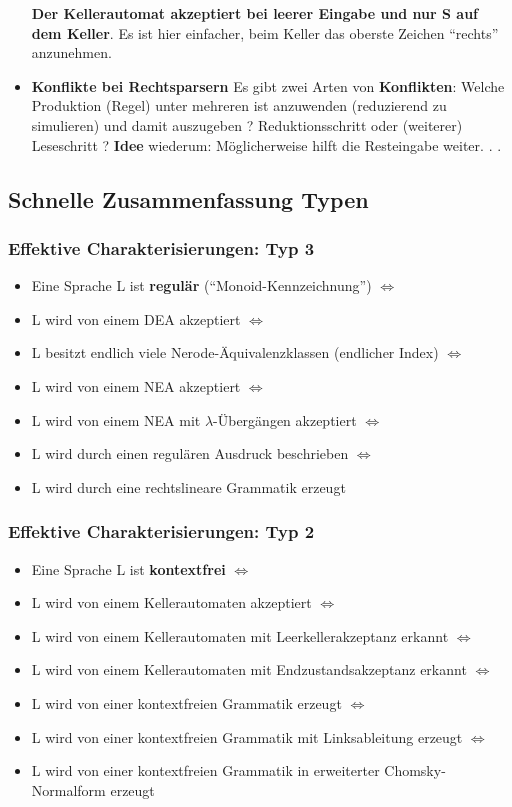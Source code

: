 \documentclass[12pt, a4paper]{article}
\begin{document}
\begin{itemize}
			\subitem\textbf{Der Kellerautomat akzeptiert bei leerer Eingabe und nur S auf dem Keller}.
			\subitem Es ist hier einfacher, beim Keller das oberste Zeichen “rechts” anzunehmen.
			
		\item \textbf{Konflikte bei Rechtsparsern}
			\subitem Es gibt zwei Arten von \textbf{Konflikten}:
			\subitem Welche Produktion (Regel) unter mehreren ist anzuwenden (reduzierend zu simulieren) und damit auszugeben ? Reduktionsschritt oder (weiterer) Leseschritt ?
			\subitem \textbf{Idee} wiederum: Möglicherweise hilft die Resteingabe weiter. . .
	\end{itemize}

	\subsection{Schnelle Zusammenfassung Typen}
		\subsubsection{Effektive Charakterisierungen: Typ 3}
		\begin{itemize}
			\item Eine Sprache L ist \textbf{regulär} (“Monoid-Kennzeichnung”) $\Leftrightarrow$
			\item L wird von einem DEA akzeptiert $\Leftrightarrow$
			\item L besitzt endlich viele Nerode-Äquivalenzklassen (endlicher Index) $\Leftrightarrow$
			\item L wird von einem NEA akzeptiert $\Leftrightarrow$
			\item L wird von einem NEA mit $\lambda$-Übergängen akzeptiert $\Leftrightarrow$
			\item L wird durch einen regulären Ausdruck beschrieben $\Leftrightarrow$
			\item L wird durch eine rechtslineare Grammatik erzeugt
		\end{itemize}
	
		\subsubsection{Effektive Charakterisierungen: Typ 2}
		\begin{itemize}
			\item Eine Sprache L ist \textbf{kontextfrei} $\Leftrightarrow$
			\item L wird von einem Kellerautomaten akzeptiert $\Leftrightarrow$
			\item L wird von einem Kellerautomaten mit Leerkellerakzeptanz erkannt $\Leftrightarrow$
			\item L wird von einem Kellerautomaten mit Endzustandsakzeptanz erkannt $\Leftrightarrow$
			\item L wird von einer kontextfreien Grammatik erzeugt $\Leftrightarrow$
			\item L wird von einer kontextfreien Grammatik mit Linksableitung erzeugt $\Leftrightarrow$
			\item L wird von einer kontextfreien Grammatik in erweiterter Chomsky-Normalform erzeugt
		\end{itemize}
	
\end{document}
